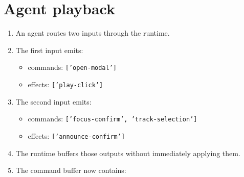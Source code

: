 \section{Agent playback}\label{record-153-agent-playback}

\begin{enumerate}
\def\labelenumi{\arabic{enumi}.}
\tightlist
\item
  An agent routes two inputs through the runtime.
\item
  The first input emits:

  \begin{itemize}
  \tightlist
  \item
    commands: \texttt{[\allowbreak{}'\allowbreak{}o\allowbreak{}p\allowbreak{}e\allowbreak{}n\allowbreak{}-\allowbreak{}m\allowbreak{}o\allowbreak{}d\allowbreak{}a\allowbreak{}l\allowbreak{}'\allowbreak{}]}
  \item
    effects: \texttt{[\allowbreak{}'\allowbreak{}p\allowbreak{}l\allowbreak{}a\allowbreak{}y\allowbreak{}-\allowbreak{}c\allowbreak{}l\allowbreak{}i\allowbreak{}c\allowbreak{}k\allowbreak{}'\allowbreak{}]}
  \end{itemize}
\item
  The second input emits:

  \begin{itemize}
  \tightlist
  \item
    commands: \texttt{[\allowbreak{}'\allowbreak{}f\allowbreak{}o\allowbreak{}c\allowbreak{}u\allowbreak{}s\allowbreak{}-\allowbreak{}c\allowbreak{}o\allowbreak{}n\allowbreak{}f\allowbreak{}i\allowbreak{}r\allowbreak{}m\allowbreak{}'\allowbreak{},\allowbreak{} \allowbreak{}'\allowbreak{}t\allowbreak{}r\allowbreak{}a\allowbreak{}c\allowbreak{}k\allowbreak{}-\allowbreak{}s\allowbreak{}e\allowbreak{}l\allowbreak{}e\allowbreak{}c\allowbreak{}t\allowbreak{}i\allowbreak{}o\allowbreak{}n\allowbreak{}'\allowbreak{}]}
  \item
    effects: \texttt{[\allowbreak{}'\allowbreak{}a\allowbreak{}n\allowbreak{}n\allowbreak{}o\allowbreak{}u\allowbreak{}n\allowbreak{}c\allowbreak{}e\allowbreak{}-\allowbreak{}c\allowbreak{}o\allowbreak{}n\allowbreak{}f\allowbreak{}i\allowbreak{}r\allowbreak{}m\allowbreak{}'\allowbreak{}]}
  \end{itemize}
\item
  The runtime buffers those outputs without immediately applying them.
\item
  The command buffer now contains:


\end{enumerate}
